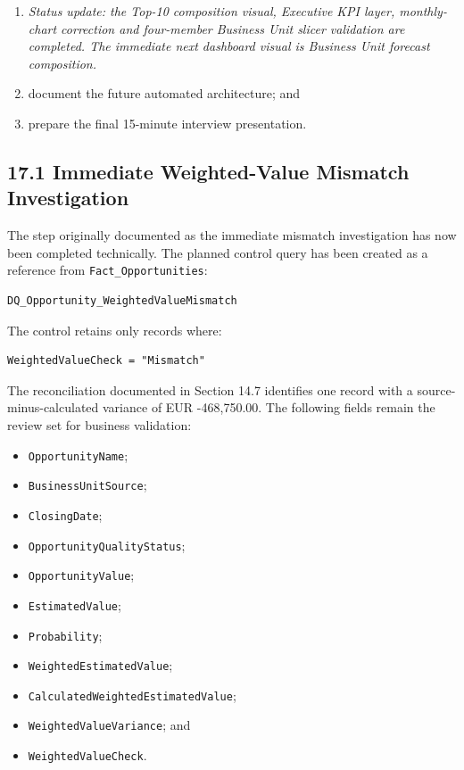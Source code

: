 \documentclass[11pt,a4paper]{article}
\begin{document}
\begin{enumerate}[leftmargin=9mm,itemsep=4pt]
    (\textit{current immediate implementation phase: Top-10 Actual-versus-Accrual
    composition and final presentation polish});
    \item[] \textit{Status update: the Top-10 composition visual, Executive KPI layer,
    monthly-chart correction and four-member Business Unit slicer validation are
    completed. The immediate next dashboard visual is Business Unit forecast
    composition.}
    \item document the future automated architecture; and
    \item prepare the final 15-minute interview presentation.
\end{enumerate}

\subsection{17.1 Immediate Weighted-Value Mismatch Investigation}

The step originally documented as the immediate mismatch investigation has now
been completed technically. The planned control query has been created as a
reference from \texttt{Fact\_Opportunities}:

\begin{lstlisting}[style=powerquery]
DQ_Opportunity_WeightedValueMismatch
\end{lstlisting}

The control retains only records where:

\begin{lstlisting}[style=powerquery]
WeightedValueCheck = "Mismatch"
\end{lstlisting}

The reconciliation documented in Section 14.7 identifies one record with a
source-minus-calculated variance of EUR -468,750.00. The following fields remain
the review set for business validation:

\begin{itemize}[leftmargin=7mm,itemsep=2pt]
    \item \texttt{OpportunityName};
    \item \texttt{BusinessUnitSource};
    \item \texttt{ClosingDate};
    \item \texttt{OpportunityQualityStatus};
    \item \texttt{OpportunityValue};
    \item \texttt{EstimatedValue};
    \item \texttt{Probability};
    \item \texttt{WeightedEstimatedValue};
    \item \texttt{CalculatedWeightedEstimatedValue};
    \item \texttt{WeightedValueVariance}; and
    \item \texttt{WeightedValueCheck}.
\end{itemize}
\end{document}
